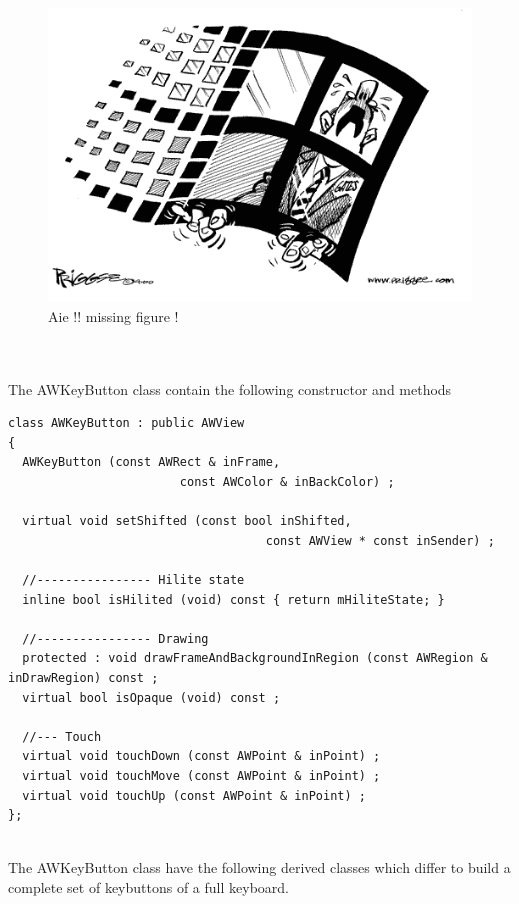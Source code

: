 \documentclass[a4paper,11pt]{extarticle}
\begin{document}
\begin{figure}[htbp]
   \centering
   \includegraphics[scale=0.55]{AWFig.png} 
   \caption{Aie !! missing figure !}
   \label{fig:17}
\end{figure}

~\\

~\\ The AWKeyButton class contain the following constructor and methods

\begin{lstlisting}[language=Arduinonl]
class AWKeyButton : public AWView
{
  AWKeyButton (const AWRect & inFrame,
                        const AWColor & inBackColor) ;
  
  virtual void setShifted (const bool inShifted,
                                    const AWView * const inSender) ;

  //---------------- Hilite state
  inline bool isHilited (void) const { return mHiliteState; }
  
  //---------------- Drawing
  protected : void drawFrameAndBackgroundInRegion (const AWRegion & inDrawRegion) const ;
  virtual bool isOpaque (void) const ;

  //--- Touch
  virtual void touchDown (const AWPoint & inPoint) ;
  virtual void touchMove (const AWPoint & inPoint) ;
  virtual void touchUp (const AWPoint & inPoint) ;
};
\end{lstlisting}

~\\ The AWKeyButton class have the following derived classes which differ to build a complete set of keybuttons of a full keyboard.
\end{document}
